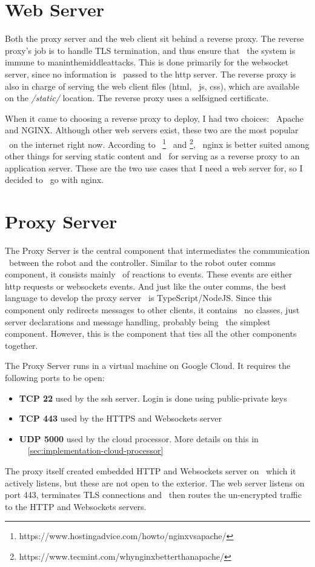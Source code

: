 \section{Web Server}
\label{sec:web-server}
Both the proxy server and the web client sit behind a reverse proxy.
The reverse proxy's job is to handle TLS termination, and thus ensure that \
the system is immune to man\-in\-the\-middle\-attacks.
This is done primarily for the websocket server, since no information is \
passed to the http server.
The reverse proxy is also in charge of serving the web client files (html, \
js, css), which are available on the \textit{/static/} location.
The reverse proxy uses a self\-signed certificate.

When it came to choosing a reverse proxy to deploy, I had two choices: \
Apache and NGINX.
Although other web servers exist, these two are the most popular \
on the internet right now.
According to \
\footnote{https://www.hostingadvice.com/how\-to/nginx\-vs\-apache/} \
and \footnote{https://www.tecmint.com/why\-nginx\-better\-than\-apache/}, \
nginx is better suited among other things for serving static content and \
for serving as a reverse proxy to an application server.
These are the two use cases that I need a web server for, so I decided to \
go with nginx.



\section{Proxy Server}
\label{sec:implementation-proxy-server}
The Proxy Server is the central component that intermediates the communication \
between the robot and the controller.
Similar to the robot outer comms component, it consists mainly \
of reactions to events.
These events are either http requests or websockets events.
And just like the outer comms, the best language to develop the proxy server \
is TypeScript/NodeJS.
Since this component only redirects messages to other clients, it contains \
no classes, just server declarations and message handling, probably being \
the simplest component.
However, this is the component that ties all the other components together.

The Proxy Server runs in a virtual machine on Google Cloud.
It requires the following ports to be open:
\begin{itemize}
    \item \textbf{TCP 22} used by the ssh server. Login is done using public-private keys
    \item \textbf{TCP 443} used by the HTTPS and Websockets server
    \item \textbf{UDP 5000} used by the cloud processor. More details on this in \
            ~\ref{sec:implementation-cloud-processor}
\end{itemize}
The proxy itself created embedded HTTP and Websockets server on \
which it actively listens, but these are not open to the exterior.
The web server listens on port 443, terminates TLS connections and \
then routes the un-encrypted traffic to the HTTP and Websockets servers.

